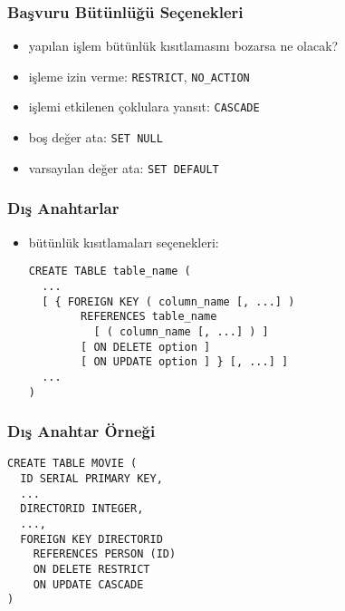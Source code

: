 \documentclass[dvipsnames]{beamer}
\theoremstyle{plain}
\begin{document}
\begin{frame}
  \frametitle{Başvuru Bütünlüğü Seçenekleri}
  
  \begin{itemize}
    \item yapılan işlem bütünlük kısıtlamasını bozarsa ne olacak?

    \medskip
    \item işleme izin verme: \texttt{RESTRICT}, \texttt{NO\_ACTION}
    \item işlemi etkilenen çoklulara yansıt: \texttt{CASCADE}
    \item boş değer ata: \texttt{SET NULL}
    \item varsayılan değer ata: \texttt{SET DEFAULT}
  \end{itemize}
\end{frame}

\begin{frame}[fragile]
  \frametitle{Dış Anahtarlar}

  \begin{itemize}
    \item bütünlük kısıtlamaları seçenekleri:
    \begin{lstlisting}
CREATE TABLE table_name (
  ...
  [ { FOREIGN KEY ( column_name [, ...] )
        REFERENCES table_name
          [ ( column_name [, ...] ) ]
        [ ON DELETE option ]
        [ ON UPDATE option ] } [, ...] ]
  ...
)
    \end{lstlisting}
  \end{itemize}
\end{frame}

\begin{frame}[fragile]
  \frametitle{Dış Anahtar Örneği}

  \begin{lstlisting}
CREATE TABLE MOVIE (
  ID SERIAL PRIMARY KEY,
  ...
  DIRECTORID INTEGER,
  ...,
  FOREIGN KEY DIRECTORID
    REFERENCES PERSON (ID)
    ON DELETE RESTRICT
    ON UPDATE CASCADE
)
  \end{lstlisting}
\end{frame}
\end{document}
